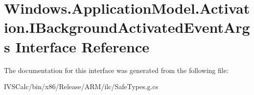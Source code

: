 \hypertarget{interface_windows_1_1_application_model_1_1_activation_1_1_i_background_activated_event_args}{}\section{Windows.\+Application\+Model.\+Activation.\+I\+Background\+Activated\+Event\+Args Interface Reference}
\label{interface_windows_1_1_application_model_1_1_activation_1_1_i_background_activated_event_args}


The documentation for this interface was generated from the following file\+:\begin{DoxyCompactItemize}
\item 
I\+V\+S\+Calc/bin/x86/\+Release/\+A\+R\+M/ilc/Safe\+Types.\+g.\+cs\end{DoxyCompactItemize}
